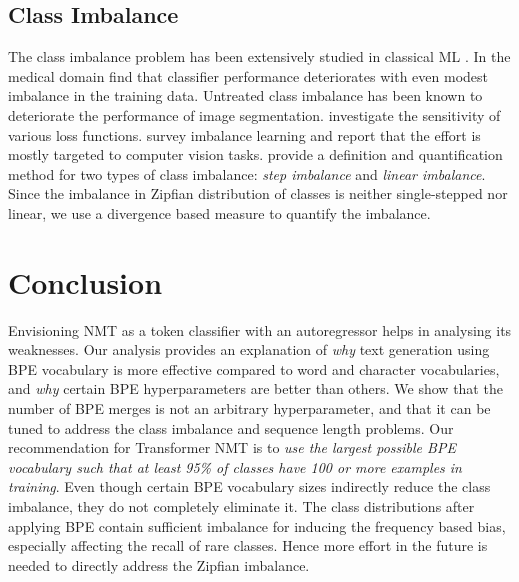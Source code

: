 \subsection{Class Imbalance}
\label{sec:rel-class-imb}
The class imbalance problem has been extensively studied in classical ML \cite{japkowicz2002ClassImbalance}.
In the medical domain \citet{Maciej2008MedicalImbalance} find that classifier performance deteriorates with even modest imbalance in the training data.
Untreated class imbalance has been known to deteriorate the performance of image segmentation.  \citet{Sudre2017GeneralizedDice} investigate the sensitivity of various loss functions.
\citet{Johnson2019SurveyImbalance} survey imbalance learning and report that the effort is mostly targeted to computer vision tasks.
\citet{buda-etal-2018-imbalance-cnn} provide a definition and quantification method for two types of class imbalance: \textit{step imbalance} and \textit{linear imbalance}.
Since the imbalance in Zipfian distribution of classes is neither single-stepped nor linear, we use a divergence based measure to quantify the imbalance.


\section{Conclusion}
\label{sec:conclusion}
Envisioning NMT as a token classifier with an autoregressor helps in analysing its weaknesses.
Our analysis provides an explanation of \textit{why} text generation using BPE vocabulary is more effective compared to word and character vocabularies, and \textit{why} certain BPE hyperparameters are better than others.
We show that the number of BPE merges is not an arbitrary hyperparameter, and that it can be tuned to address the class imbalance and sequence length problems. 
Our recommendation for Transformer NMT is to \textit{use the largest possible BPE vocabulary such that at least 95\% of classes have 100 or more examples in training}.
Even though certain BPE vocabulary sizes indirectly reduce the class imbalance, they do not completely eliminate it.
The class distributions after applying BPE contain sufficient imbalance for inducing the frequency based bias, especially affecting the recall of rare classes. 
Hence more effort in the future is needed to directly address the Zipfian imbalance.

